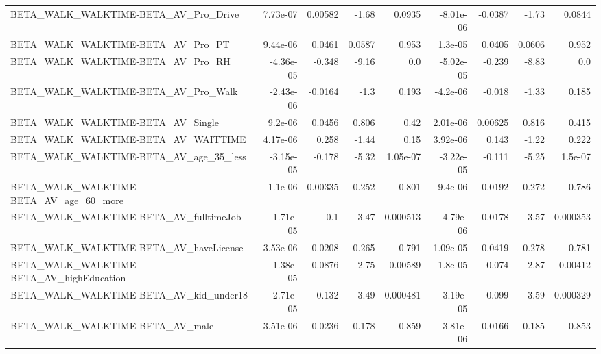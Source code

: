 \begin{tabular}{lrrrrrrrr}
BETA\_WALK\_WALKTIME-BETA\_AV\_Pro\_Drive               &    7.73e-07 &      0.00582 &     -1.68 &   0.0935 &  -8.01e-06 &     -0.0387 &        -1.73 &        0.0844 \\
BETA\_WALK\_WALKTIME-BETA\_AV\_Pro\_PT                  &    9.44e-06 &       0.0461 &    0.0587 &    0.953 &    1.3e-05 &      0.0405 &       0.0606 &         0.952 \\
BETA\_WALK\_WALKTIME-BETA\_AV\_Pro\_RH                  &   -4.36e-05 &       -0.348 &     -9.16 &      0.0 &  -5.02e-05 &      -0.239 &        -8.83 &           0.0 \\
BETA\_WALK\_WALKTIME-BETA\_AV\_Pro\_Walk                &   -2.43e-06 &      -0.0164 &      -1.3 &    0.193 &   -4.2e-06 &      -0.018 &        -1.33 &         0.185 \\
BETA\_WALK\_WALKTIME-BETA\_AV\_Single                  &     9.2e-06 &       0.0456 &     0.806 &     0.42 &   2.01e-06 &     0.00625 &        0.816 &         0.415 \\
BETA\_WALK\_WALKTIME-BETA\_AV\_WAITTIME                &    4.17e-06 &        0.258 &     -1.44 &     0.15 &   3.92e-06 &       0.143 &        -1.22 &         0.222 \\
BETA\_WALK\_WALKTIME-BETA\_AV\_age\_35\_less             &   -3.15e-05 &       -0.178 &     -5.32 & 1.05e-07 &  -3.22e-05 &      -0.111 &        -5.25 &       1.5e-07 \\
BETA\_WALK\_WALKTIME-BETA\_AV\_age\_60\_more             &     1.1e-06 &      0.00335 &    -0.252 &    0.801 &    9.4e-06 &      0.0192 &       -0.272 &         0.786 \\
BETA\_WALK\_WALKTIME-BETA\_AV\_fulltimeJob             &   -1.71e-05 &         -0.1 &     -3.47 & 0.000513 &  -4.79e-06 &     -0.0178 &        -3.57 &      0.000353 \\
BETA\_WALK\_WALKTIME-BETA\_AV\_haveLicense             &    3.53e-06 &       0.0208 &    -0.265 &    0.791 &   1.09e-05 &      0.0419 &       -0.278 &         0.781 \\
BETA\_WALK\_WALKTIME-BETA\_AV\_highEducation           &   -1.38e-05 &      -0.0876 &     -2.75 &  0.00589 &   -1.8e-05 &      -0.074 &        -2.87 &       0.00412 \\
BETA\_WALK\_WALKTIME-BETA\_AV\_kid\_under18             &   -2.71e-05 &       -0.132 &     -3.49 & 0.000481 &  -3.19e-05 &      -0.099 &        -3.59 &      0.000329 \\
BETA\_WALK\_WALKTIME-BETA\_AV\_male                    &    3.51e-06 &       0.0236 &    -0.178 &    0.859 &  -3.81e-06 &     -0.0166 &       -0.185 &         0.853 \\

\end{tabular}
